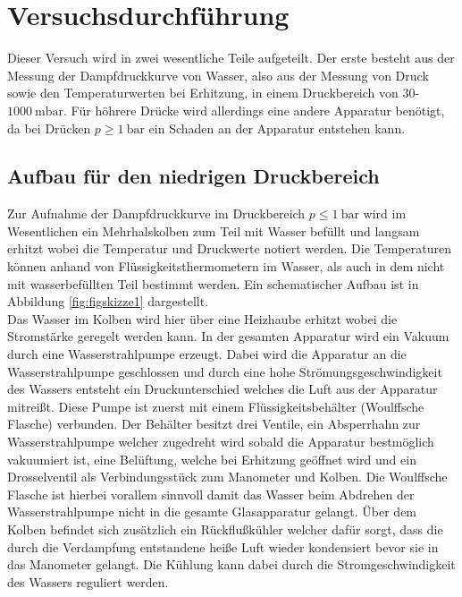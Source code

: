 \section{Versuchsdurchführung}

Dieser Versuch wird in zwei wesentliche Teile aufgeteilt. Der erste besteht aus der Messung der Dampfdruckkurve von Wasser, also aus der Messung von Druck sowie den Temperaturwerten bei Erhitzung, in einem 
Druckbereich von $30$-$\SI{1000}{\milli\bar}$. Für höhrere Drücke wird allerdings eine andere Apparatur benötigt, da bei Drücken $p \geq \SI{1}{\bar}$ ein Schaden an der Apparatur entstehen kann.

\subsection{Aufbau für den niedrigen Druckbereich} %
Zur Aufnahme der Dampfdruckkurve im Druckbereich $p \leq \SI{1}{\bar}$ wird im Wesentlichen ein Mehrhalskolben zum Teil mit Wasser befüllt und langsam erhitzt wobei die Temperatur und Druckwerte notiert werden. 
Die Temperaturen können anhand von Flüssigkeitsthermometern im Wasser, als auch in dem nicht mit wasserbefüllten Teil bestimmt werden.
Ein schematischer Aufbau ist in Abbildung \ref{fig:figskizze1} dargestellt. 
\newline
\\
Das Wasser im Kolben wird hier über eine Heizhaube erhitzt wobei die Stromstärke geregelt werden kann. 
In der gesamten Apparatur wird ein Vakuum durch eine Wasserstrahlpumpe erzeugt. Dabei wird die Apparatur an die Wasserstrahlpumpe geschlossen und durch eine hohe Strömungsgeschwindigkeit
des Wassers entsteht ein Druckunterschied welches die Luft aus der Apparatur mitreißt. Diese Pumpe ist zuerst mit einem Flüssigkeitsbehälter (Woulffsche Flasche) verbunden. Der Behälter besitzt drei Ventile, ein Absperrhahn zur Wasserstrahlpumpe welcher 
zugedreht wird sobald die Apparatur bestmöglich vakuumiert ist, eine Belüftung, welche bei Erhitzung geöffnet wird und ein Drosselventil als Verbindungsstück zum Manometer und Kolben. 
Die Woulffsche Flasche ist hierbei vorallem sinnvoll damit das Wasser beim Abdrehen der Wasserstrahlpumpe nicht in die gesamte Glasapparatur gelangt.
Über dem Kolben befindet sich zusätzlich ein Rückflußkühler welcher dafür sorgt, dass die durch die Verdampfung entstandene heiße Luft wieder kondensiert bevor sie in das Manometer gelangt. Die Kühlung kann dabei durch die Stromgeschwindigkeit
des Wassers reguliert werden.

